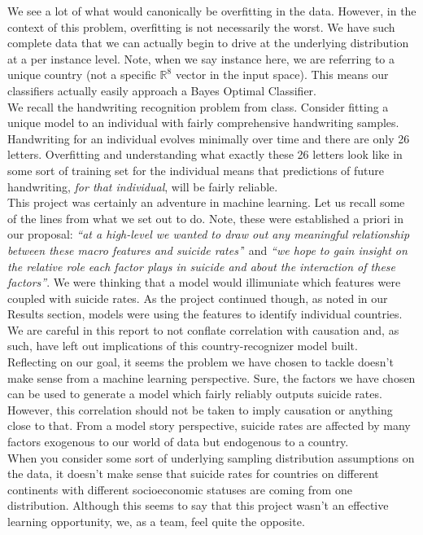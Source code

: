 \documentclass{article}
\begin{document}
\begin{multicols}{2}
We see a lot of what would canonically be overfitting in the data. However, in the context of this problem, overfitting is not necessarily the worst. We have such complete data that we can actually begin to drive at the underlying distribution at a per instance level. Note, when we say instance here, we are referring to a unique country (not a specific $\mathbb{R}^8$ vector in the input space). This means our classifiers actually easily approach a Bayes Optimal Classifier. \\
We recall the handwriting recognition problem from class. Consider fitting a unique model to an individual with fairly comprehensive handwriting samples. Handwriting for an individual evolves minimally over time and there are only 26 letters. Overfitting and understanding what exactly these 26 letters look like in some sort of training set for the individual means that predictions of future handwriting, \textit{for that individual}, will be fairly reliable. \\
This project was certainly an adventure in machine learning. Let us recall some of the lines from what we set out to do. Note, these were established a priori in our proposal: \textit{``at a high-level we wanted to draw out any meaningful relationship between these macro features and suicide rates'}' and \textit{``we hope to gain insight on the
relative role each factor plays in suicide and about the interaction of these factors''}. We were thinking that a model would illimuniate which features were coupled with suicide rates. As the project continued though, as noted in our Results section, models were using the features to identify individual countries. We are careful in this report to not conflate correlation with causation and, as such, have left out implications of this country-recognizer model built. \\
Reflecting on our goal, it seems the problem we have chosen to tackle doesn't make sense from a machine learning perspective. Sure, the factors we have chosen can be used to generate a model which fairly reliably outputs suicide rates. However, this correlation should not be taken to imply causation or anything close to that. From a model story perspective, suicide rates are affected by many factors exogenous to our world of data but endogenous to a country. \\
When you consider some sort of underlying sampling distribution assumptions on the data, it doesn't make sense that suicide rates for countries on different continents with different socioeconomic statuses are coming from one distribution. Although this seems to say that this project wasn't an effective learning opportunity, we, as a team, feel quite the opposite. \\

\end{multicols}
\end{document}
